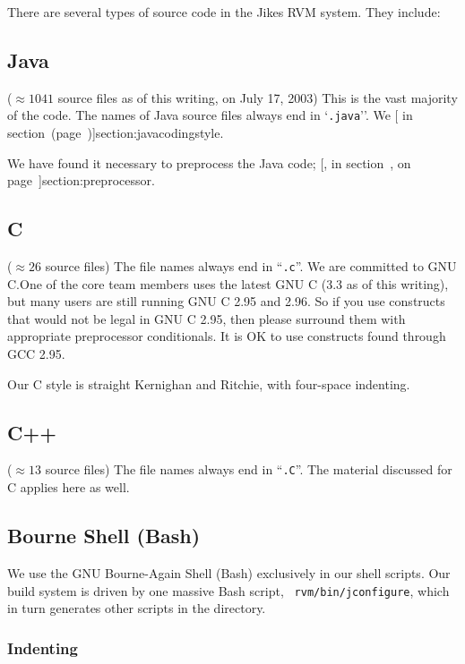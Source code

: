 There are several types of source code in the Jikes RVM system.  They
include:


\subsection{Java} 
($\approx 1041$ source files as of this writing, on July 17, 2003)  This is
the vast majority of the code.  The names of Java source files always end in
`{\tt .java}''.   We [ in
section~\Ref (page~\Pageref)]{section:javacodingstyle}. 

We have found it necessary to preprocess the Java code; [, in
  section~\Ref, on page~\Pageref]{section:preprocessor}.


\subsection {C}

($\approx 26$ source files)  The file names always
end in ``{\tt .c}''.  We are committed to GNU C.\@  One of the core team
members uses the latest GNU C (3.3 as of this writing), but many users
are still running GNU C 2.95 and 2.96.  So if you use constructs that
would not be legal in GNU C 2.95, then please surround them with
appropriate preprocessor conditionals.  It is OK to use constructs
found through GCC 2.95.

Our C style is straight Kernighan and Ritchie, with four-space
indenting.  

\subsection{C++} 

($\approx 13$ source files)  The file names always end in
``{\tt .C}''.   The material discussed for C applies here as well.

\subsection{Bourne Shell (Bash)}

We use the GNU Bourne-Again Shell (Bash) exclusively in our shell
scripts.  Our build system is driven by one massive Bash script, {\tt
rvm/bin/jconfigure}, which in turn generates other scripts in the
 directory.

\subsubsection{Indenting}


